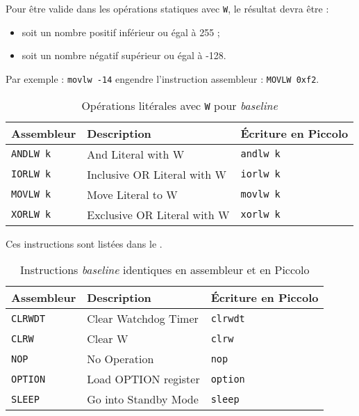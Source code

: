 Pour être valide dans les opérations statiques avec \texttt{W}, le résultat devra être :
\begin{itemize}
  \item soit un nombre positif inférieur ou égal à 255 ;
  \item soit un nombre négatif supérieur ou égal à -128.
\end{itemize}

Par exemple : \texttt{movlw -14} engendre l’instruction assembleur : \texttt{MOVLW 0xf2}.


\begin{table}[!ht]
  \centering
  \small
  \begin{tabular}{lll}
    \textbf{Assembleur} & \textbf{Description} & \textbf{Écriture en Piccolo}\\
    \hline
    \texttt{ANDLW k} & And Literal with W & \texttt{andlw k}\\
    \texttt{IORLW k} & Inclusive OR Literal with W & \texttt{iorlw k}\\
    \texttt{MOVLW k} & Move Literal to W & \texttt{movlw k}\\
    \texttt{XORLW k} & Exclusive OR Literal with W & \texttt{xorlw k}\\
    \hline
  \end{tabular}
  \caption{Opérations litérales avec \texttt{W} pour \emph{baseline}}
\end{table}



Ces instructions sont listées dans le .

\begin{table}[!ht]
  \centering
  \small
  \begin{tabular}{lll}
    \textbf{Assembleur} & \textbf{Description} & \textbf{Écriture en Piccolo}\\
    \hline
    \texttt{CLRWDT} & Clear Watchdog Timer & \texttt{clrwdt}\\
    \texttt{CLRW} & Clear W & \texttt{clrw}\\
    \texttt{NOP} & No Operation & \texttt{nop}\\
    \texttt{OPTION} & Load OPTION register & \texttt{option}\\
    \texttt{SLEEP} & Go into Standby Mode & \texttt{sleep}\\
    \hline
  \end{tabular}
  \caption{Instructions \emph{baseline} identiques en assembleur et en Piccolo}
\end{table}
















